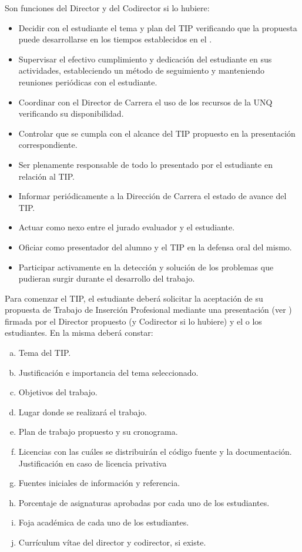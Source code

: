 \articulo Son funciones del Director y del Codirector si lo hubiere:
\begin{itemize}
 \item Decidir con el estudiante el tema y plan del TIP verificando que la
 propuesta puede desarrollarse en los tiempos establecidos en el
 \artHoras.
 \item Supervisar el efectivo cumplimiento y dedicación del estudiante en
 sus actividades, estableciendo un método de seguimiento y
 manteniendo reuniones periódicas con el estudiante.
 \item Coordinar con el Director de Carrera el uso de los recursos de la
 UNQ verificando su disponibilidad.
 \item Controlar que se cumpla con el alcance del TIP propuesto en la
 presentación correspondiente.
 \item Ser plenamente responsable de todo lo presentado por el
 estudiante en relación al TIP.
 \item Informar periódicamente a la Dirección de Carrera el estado de
 avance del TIP.
 \item Actuar como nexo entre el jurado evaluador y el estudiante.
 \item Oficiar como presentador del alumno y el TIP en la defensa oral del
 mismo.
 \item Participar activamente en la detección y solución de los problemas
 que pudieran surgir durante el desarrollo del trabajo.
\end{itemize}



\articulo Para comenzar el TIP, el estudiante deberá solicitar la aceptación
de su propuesta de Trabajo de Inserción Profesional mediante una presentación (ver
\anexoPresentacionPlan) firmada por el Director propuesto (y Codirector si lo
hubiere) y el o los estudiantes. En la misma deberá constar:

\begin{enumerate}[a.]
\item Tema del TIP.
\item Justificación e importancia del tema seleccionado.
\item Objetivos del trabajo.
\item Lugar donde se realizará el trabajo.
\item Plan de trabajo propuesto y su cronograma.
\item Licencias con las cuáles se distribuirán el código fuente y la
documentación.
Justificación en caso de licencia privativa \nuevo{ }
\item Fuentes iniciales de información y referencia.
\item Porcentaje de asignaturas aprobadas por cada uno de los estudiantes.
\item Foja académica de cada uno de los estudiantes.
\item Currículum vítae del director y codirector, si existe.
\end{enumerate}

